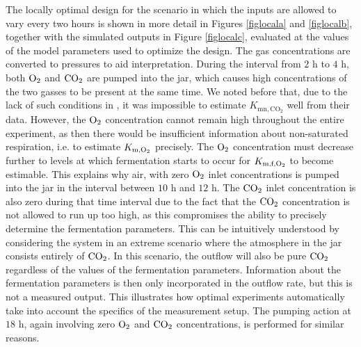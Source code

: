 The locally optimal design for the scenario in which the inputs are allowed to vary every two hours is shown in more detail in Figures \ref{figlocala} and  \ref{figlocalb}, together with the simulated outputs in Figure \ref{figlocalc}, evaluated at the values of the model parameters used to optimize the design. {\color{red}The gas concentrations are converted to pressures to aid interpretation.} During the interval from $2$ h to $4$ h, both $\text{O}_2$ and $\text{CO}_2$ are pumped into the jar, which causes high concentrations of the two gasses to be present at the same time. We noted before that, due to the lack of such conditions in \textcite{ho}, it was impossible to estimate $K_{\text{mn},\text{CO}_2}$ well from their data. However, the $\text{O}_2$ concentration cannot remain high throughout the entire experiment, as then there would be insufficient information about non-saturated respiration, i.e. to estimate $K_{\text{m}, \text{O}_2}$ precisely. The $\text{O}_2$ concentration must decrease further to levels at which fermentation starts to occur for $K_{\text{m,f},\text{O}_2}$ to become estimable. This explains why air, with zero $\text{O}_2$ inlet concentrations is pumped into the jar in the interval between $10$ h and $12$ h. The $\text{CO}_2$ inlet concentration is also zero during that time interval due to the fact that the $\text{CO}_2$ concentration is not allowed to run up too high, as this compromises the ability to precisely determine the fermentation parameters. This can be intuitively understood by considering the system in an extreme scenario where the atmosphere in the jar consists entirely of $\text{CO}_2$. In this scenario, the outflow will also be pure $\text{CO}_2$ regardless of the values of the fermentation parameters. Information about the fermentation parameters is then only incorporated in the outflow rate, but this is not a measured output. This illustrates how optimal experiments automatically take into account the specifics of the measurement setup.  The pumping action at $18$ h, again involving zero $\text{O}_2$ and $\text{CO}_2$ concentrations, is performed for similar reasons.

